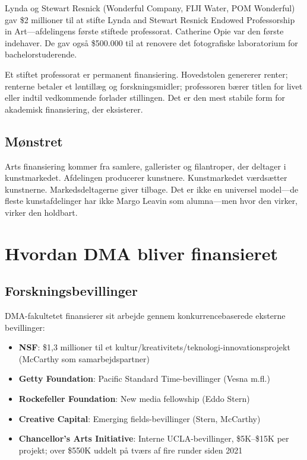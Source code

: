 \documentclass[10pt,letterpaper,twocolumn]{article}
\newcommand{\dma}{\textsc{DMA}}
\begin{document}
Lynda og Stewart Resnick (Wonderful Company, FIJI Water, POM Wonderful) gav \$2 millioner til at stifte Lynda and Stewart Resnick Endowed Professorship in Art---afdelingens første stiftede professorat. Catherine Opie var den første indehaver. De gav også \$500.000 til at renovere det fotografiske laboratorium for bachelorstuderende.

Et stiftet professorat er permanent finansiering. Hovedstolen genererer renter; renterne betaler et løntillæg og forskningsmidler; professoren bærer titlen for livet eller indtil vedkommende forlader stillingen. Det er den mest stabile form for akademisk finansiering, der eksisterer.

\subsection{Mønstret}

Arts finansiering kommer fra samlere, gallerister og filantroper, der deltager i kunstmarkedet. Afdelingen producerer kunstnere. Kunstmarkedet værdsætter kunstnerne. Markedsdeltagerne giver tilbage. Det er ikke en universel model---de fleste kunstafdelinger har ikke Margo Leavin som alumna---men hvor den virker, virker den holdbart.

\section{Hvordan DMA bliver finansieret}

\subsection{Forskningsbevillinger}

\dma{}-fakultetet finansierer sit arbejde gennem konkurrencebaserede eksterne bevillinger:

\begin{itemize}
  \item \textbf{NSF}: \$1,3 millioner til et kultur/kreativitets/teknologi-innovationsprojekt (McCarthy som samarbejdspartner)
  \item \textbf{Getty Foundation}: Pacific Standard Time-bevillinger (Vesna m.fl.)
  \item \textbf{Rockefeller Foundation}: New media fellowship (Eddo Stern)
  \item \textbf{Creative Capital}: Emerging fields-bevillinger (Stern, McCarthy)
  \item \textbf{Chancellor's Arts Initiative}: Interne UCLA-bevillinger, \$5K--\$15K per projekt; over \$550K uddelt på tværs af fire runder siden 2021
\end{itemize}
\end{document}

